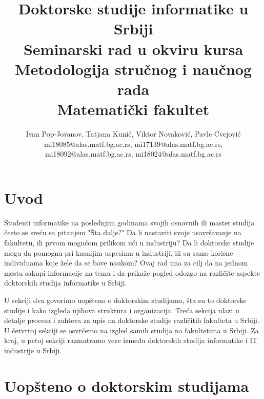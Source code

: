 \documentclass[a4paper]{article}
\begin{document}
\title{Doktorske studije informatike u Srbiji\\ \small{Seminarski rad u okviru kursa\\Metodologija stručnog i naučnog rada\\ Matematički fakultet}}

\author{Ivan Pop-Jovanov, Tatjana Kunić, Viktor Novaković, Pavle Cvejović\\ mi18085@alas.matf.bg.ac.rs, mi17139@alas.matf.bg.ac.rs, \\mi18092@alas.matf.bg.ac.rs, mi18024@alas.matf.bg.ac.rs}


\maketitle


\tableofcontents

\newpage

\section{Uvod}
\label{sec:uvod}

Studenti informatike na poslednjim godinama svojih osnovnih ili master studija često se sreću sa pitanjem "Šta dalje?" Da li nastaviti svoje usavršavanje na fakultetu, ili prvom mogućom prilikom ući u industriju? Da li doktorske studije mogu da pomognu pri kasnijim uspesima u industriji, ili su samo korisne individuama koje žele da se bave naukom? Ovaj rad ima za cilj da na jednom mestu sakupi informacije na temu i da prikaže pogled odozgo na različite aspekte doktorskih studija informatike u Srbiji.

U sekciji dva govorimo uopšteno o doktorskim studijama, šta su to doktorske studije i kako izgleda njihova struktura i organizacija. Treća sekcija ulazi u detalje procesa i zahteva za upis na doktorske studije različitih fakulteta u Srbiji. U četvrtoj sekciji se osvrćemo na izgled samih studija na fakultetima u Srbiji. Za kraj, u petoj sekciji razmatramo veze između doktorskih studija informatike i IT industrije u Srbiji.

\section{Uopšteno o doktorskim studijama}
\label{sec:uopsteno}
\end{document}
